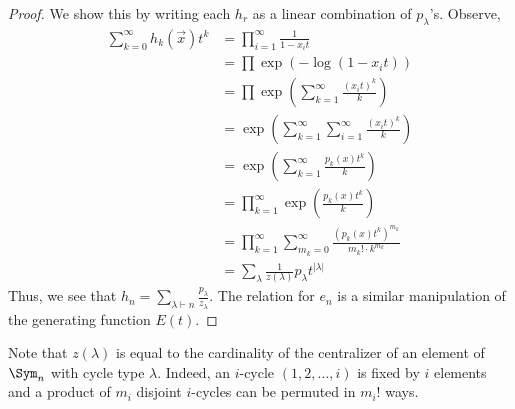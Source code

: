 \documentclass[11pt,leqno,oneside]{amsart}
\numberwithin{thm}{section}
\newcommand{\partitionof}{\vdash}
\begin{document}
\begin{proof}
  We show this by writing each \(h_r\) as a linear combination of
  \(p_\lambda\)'s. Observe, 
  \begin{align*}
        \sum_{k=0}^\infty h_k(\vec{x}) t^k
        & = \prod_{i=1}^\infty \frac{1}{1-x_i t} \\
        & = \prod \exp\left({-\log(1-x_i t)}\right)\\
        & = \prod \exp\left({\sum_{k=1}^\infty \frac{(x_i
          t)^k}{k}}\right) \\ 
        & = \exp\left({\sum_{k=1}^\infty \sum_{i=1}^\infty \frac{(x_i
          t)^k}{k}}\right) \\
        & = \exp\left( \sum_{k=1}^\infty \frac{p_k(x)t^k}{k} \right)
        \\
        & = \prod_{k=1}^\infty \exp\left( \frac{p_k(x)t^k}{k} \right)
        \\
        & = \prod_{k=1}^\infty \sum_{m_k = 0}^\infty
          \frac{(p_k(x)t^k)^{m_k}}{m_k! \cdot k^{m_k}} \\
        & = \sum_{\lambda} \frac{1}{z(\lambda)}p_\lambda t^{|\lambda|}
      \end{align*}
      Thus, we see that \(h_n = \sum_{\lambda \partitionof n}
      \frac{p_\lambda}{z_\lambda}\). The relation for \(e_n\) is a
      similar manipulation of the generating function \(E(t)\).
    \end{proof}
    \begin{rmk}
      Note that \(z(\lambda)\) is equal to the cardinality of the
      centralizer of an element of \(\Sym_n\) with cycle type
      \(\lambda\). Indeed, an \(i\)-cycle \((1,2,\ldots,i)\) is fixed
      by \(i\) elements and a product of \(m_i\) disjoint \(i\)-cycles
      can be permuted in \(m_i!\) ways. 
    \end{rmk}
\end{document}
